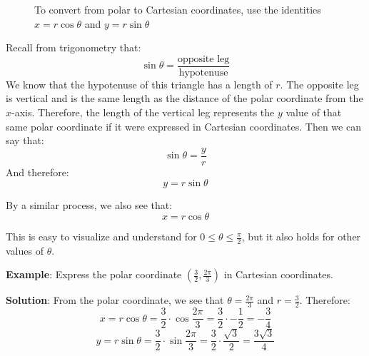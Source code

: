 \begin{figure}[htbp]
\centering
    \caption{To convert from polar to Cartesian coordinates, use the identities 
    $x = r\cos{\theta}$ and $y = r\sin{\theta}$}
    \label{fig:polar_to_cart}
    \end{figure}

Recall from trigonometry that:
$$\sin{\theta} = \frac{\text{opposite leg}}{\text{hypotenuse}}$$
We know that the hypotenuse of this triangle has a length of $r$. The opposite 
leg is vertical and is the same length as the distance of the polar coordinate 
from the $x$-axis. Therefore, the length of the vertical leg represents the 
$y$ value of that same polar coordinate if it were expressed in Cartesian 
coordinates. Then we can say that:
$$\sin{\theta} = \frac{y}{r}$$
And therefore:
$$y = r\sin{\theta}$$

By a similar process, we also see that:
$$x = r\cos{\theta}$$

This is easy to visualize and understand for $0 \leq \theta \leq \frac{\pi}{
2}$, but it also holds for other values of $\theta$. 

\textbf{Example}: Express the polar coordinate $(\frac{3}{2}, \frac{2\pi}{3})$ 
in Cartesian coordinates.

\textbf{Solution}: From the polar coordinate, we see that $\theta = \frac{2\pi
}{3}$ and $r = \frac{3}{2}$. Therefore:
$$x = r\cos{\theta} = \frac{3}{2} \cdot \cos{\frac{2\pi}{3}} = \frac{3}{2} 
\cdot -\frac{1}{2} = -\frac{3}{4}$$
$$y = r\sin{\theta} = \frac{3}{2} \cdot \sin{\frac{2\pi}{3}} = \frac{3}{2} 
\cdot \frac{\sqrt{3}}{2} = \frac{3\sqrt{3}}{4}$$

